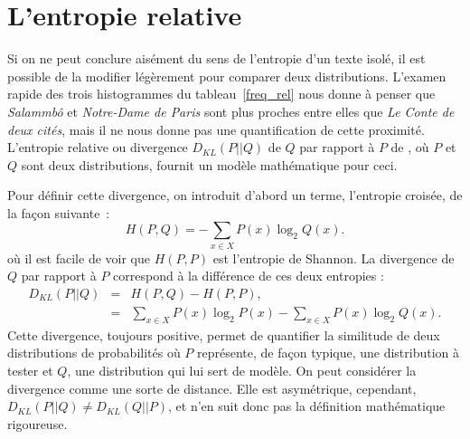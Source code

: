 \documentclass[]{article}
\begin{document}
%


\section{L'entropie relative}
Si on ne peut conclure aisément du sens de l'entropie d'un texte isolé, il est possible de la modifier légèrement pour comparer deux distributions. L'examen rapide des trois histogrammes du tableau~\ref{freq_rel} nous donne à penser que \textit{Salammbô} et \textit{Notre-Dame de Paris} sont plus proches entre elles que \textit{Le Conte de deux cités}, mais il ne nous donne pas une quantification de cette proximité. L'entropie relative ou divergence $D_{KL}(P||Q)$ de $Q$ par rapport à $P$ de \citet{Kullback1951}, où $P$ et $Q$ sont deux distributions, fournit un modèle mathématique pour ceci.

Pour définir cette divergence, on introduit d'abord un terme, l'entropie croisée, de la façon suivante~:
\[
H(P,Q) = - \sum\limits_{x \in X} {P(x)\log_2 Q(x).} 
\]
où il est facile de voir que $H(P, P)$ est l'entropie de Shannon. La divergence de $Q$ par rapport à $P$ correspond à la différence de ces deux entropies :
\[
\begin{array}{lcl}
D_{KL}(P||Q) &=& H(P, Q) - H(P, P),\\
&=& \sum\limits_{x \in X} {P(x)\log_2 P(x)} - \sum\limits_{x \in X} {P(x)\log_2 Q(x)}.
\end{array}
\]
Cette divergence, toujours positive, permet de quantifier la similitude de deux distributions de probabilités où $P$ représente, de façon typique, une distribution à tester et $Q$, une distribution qui lui sert de modèle. On peut considérer la divergence comme une sorte de distance. Elle est asymétrique, cependant, $D_{KL}(P||Q) \neq D_{KL}(Q||P)$, et n'en suit donc pas la définition mathématique rigoureuse.
\end{document}
